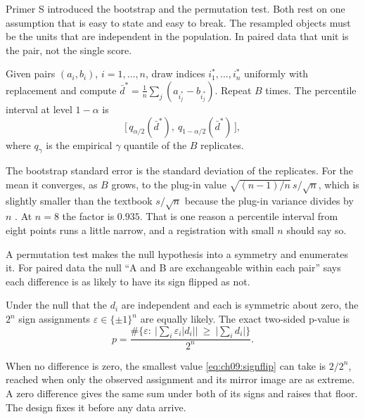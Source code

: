 Primer S introduced the bootstrap and the permutation test. Both rest on one assumption that is easy to state and easy to break. The resampled objects must be the units that are independent in the population. In paired data that unit is the pair, not the single score.

\begin{definition}\label{def:ch09:pairedboot}
Given pairs $(a_i,b_i)$, $i=1,\dots,n$, draw indices $i_1^*,\dots,i_n^*$ uniformly with replacement and compute $\bar d^*=\frac1n\sum_j (a_{i_j^*}-b_{i_j^*})$. Repeat $B$ times. The percentile interval at level $1-\alpha$ is
\begin{equation}
\big[\,q_{\alpha/2}(\bar d^*),\ q_{1-\alpha/2}(\bar d^*)\,\big],
\label{eq:ch09:pctint}
\end{equation}
where $q_\gamma$ is the empirical $\gamma$ quantile of the $B$ replicates.
\end{definition}
The bootstrap standard error is the standard deviation of the replicates. For the mean it converges, as $B$ grows, to the plug-in value $\sqrt{(n-1)/n}\,s/\sqrt n$, which is slightly smaller than the textbook $s/\sqrt n$ because the plug-in variance divides by $n$ \citep{efrontibshirani1993}. At $n=8$ the factor is $0.935$. That is one reason a percentile interval from eight points runs a little narrow, and a registration with small $n$ should say so.

A permutation test makes the null hypothesis into a symmetry and enumerates it. For paired data the null ``A and B are exchangeable within each pair'' says each difference is as likely to have its sign flipped as not.
\begin{definition}\label{def:ch09:signflip}
Under the null that the $d_i$ are independent and each is symmetric about zero, the $2^n$ sign assignments $\varepsilon\in\{\pm1\}^n$ are equally likely. The exact two-sided p-value is
\begin{equation}
p=\frac{\#\big\{\varepsilon:\ \big|\sum_i \varepsilon_i|d_i|\big|\ \ge\ \big|\sum_i d_i\big|\big\}}{2^n}.
\label{eq:ch09:signflip}
\end{equation}
\end{definition}
When no difference is zero, the smallest value \eqref{eq:ch09:signflip} can take is $2/2^n$, reached when only the observed assignment and its mirror image are as extreme. A zero difference gives the same sum under both of its signs and raises that floor. The design fixes it before any data arrive.

